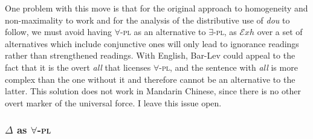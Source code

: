 \documentclass[12pt]{article}
\newcommand{\Exh}{\ensuremath{\mathcal{E}\mathit{xh}}}
\begin{document}
One problem with this move is that for the original approach to homogeneity and non-maximality to work and for the analysis of the distributive use of \emph{dou} to follow, we must avoid having \(\forall\)-\textsc{pl} as an alternative to \(\exists\)-\textsc{pl}, as {\Exh} over a set of alternatives which include conjunctive ones will only lead to ignorance readings rather than strengthened readings.
With English, Bar-Lev could appeal to the fact that it is the overt \emph{all} that licenses \(\forall\)-\textsc{pl}, and the sentence with \emph{all} is more complex than the one without it and therefore cannot be an alternative to the latter.
This solution does not work in Mandarin Chinese, since there is no other overt marker of the universal force.
I leave this issue open.
%


\subsubsection[Delta as universal pluralizer]{\(\Delta\) as \(\forall\)-\textsc{pl}}
\label{ssub:delta_as_forall_pl}
\end{document}
